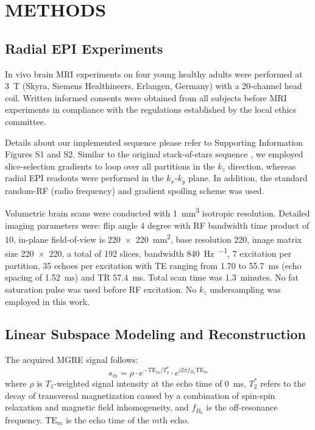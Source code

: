 \documentclass[a4paper,11pt]{article}
\begin{document}
\section{METHODS}

\subsection*{Radial EPI Experiments}

In vivo brain MRI experiments on four young healthy adults were performed at \SI{3}{\tesla}
(Skyra, Siemens Healthineers, Erlangen, Germany) with a 20-channel head coil.
Written informed consents were obtained from all subjects before MRI experiments
in compliance with the regulations established by the local ethics committee.

Details about our implemented sequence please refer to
Supporting Information Figures S1 and S2.
Similar to the original stack-of-stars sequence \cite{block_2014_rad},
we employed slice-selection gradients to loop over all partitions in the $k_z$ direction,
whereas radial EPI readouts were performed in the $k_x$-$k_y$ plane.
In addition, the standard random-RF (radio frequency)
and gradient spoiling scheme was used.

Volumetric brain scans were conducted with 1~\si{\cubic\mm} isotropic resolution.
Detailed imaging parameters were:
flip angle 4 degree with RF bandwidth time product of 10,
in-plane field-of-view is 220~$\times$~220~\si{\square\mm},
base resolution 220, image matrix size 220~$\times$~220,
a total of 192 slices, bandwidth 840~\si{\Hz \per \pixel},
7 excitation per partition,
35 echoes per excitation with TE ranging from 1.70 to 55.7~ms
(echo spacing of 1.52~\si{\ms}) and TR 57.4~ms.
Total scan time was 1.3~minutes.
No fat saturation pulse was used before RF excitation.
No $k_z$ undersampling \cite{feng_2016_vdGRASP} was employed in this work.


\subsection*{Linear Subspace Modeling and Reconstruction}

The acquired MGRE signal follows:
\begin{equation}
	s_m = \rho \cdot e^{- \text{TE}_m / T_2^*} \cdot e^{i 2\pi f_{B_0} \text{TE}_m}
	\label{EQU:mgre_signal}
\end{equation}
where $\rho$ is $T_1$-weighted signal intensity at the echo time of \SI{0}{ms},
$T_2^*$ refers to the decay of transversal magnetization caused by
a combination of spin-spin relaxation and magnetic field inhomogeneity,
and $f_{B_0}$ is the off-resonance frequency.
$\text{TE}_m$ is the echo time of the $m$th echo.
\end{document}
